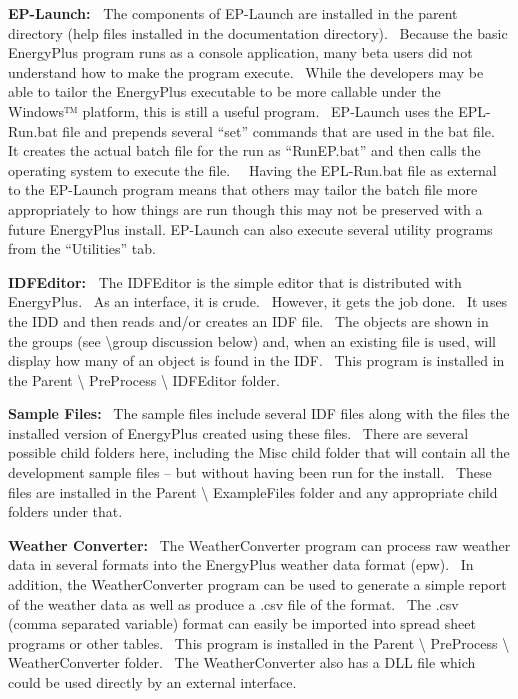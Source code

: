 \textbf{EP-Launch:~} The components of EP-Launch are installed in the parent directory (help files installed in the documentation directory).~ Because the basic EnergyPlus program runs as a console application, many beta users did not understand how to make the program execute.~ While the developers may be able to tailor the EnergyPlus executable to be more callable under the Windows™ platform, this is still a useful program.~ EP-Launch uses the EPL-Run.bat file and prepends several ``set'' commands that are used in the bat file.~ It creates the actual batch file for the run as ``RunEP.bat'' and then calls the operating system to execute the file.~~ Having the EPL-Run.bat file as external to the EP-Launch program means that others may tailor the batch file more appropriately to how things are run though this may not be preserved with a future EnergyPlus install. EP-Launch can also execute several utility programs from the ``Utilities'' tab.

\textbf{IDFEditor:~} The IDFEditor is the simple editor that is distributed with EnergyPlus.~ As an interface, it is crude.~ However, it gets the job done.~ It uses the IDD and then reads and/or creates an IDF file.~ The objects are shown in the groups (see \textbackslash{}group discussion below) and, when an existing file is used, will display how many of an object is found in the IDF.~ This program is installed in the Parent \textbackslash{} PreProcess \textbackslash{} IDFEditor folder.

\textbf{Sample Files:}~ The sample files include several IDF files along with the files the installed version of EnergyPlus created using these files.~ There are several possible child folders here, including the Misc child folder that will contain all the development sample files -- but without having been run for the install.~ These files are installed in the Parent \textbackslash{} ExampleFiles folder and any appropriate child folders under that.

\textbf{Weather Converter:}~ The WeatherConverter program can process raw weather data in several formats into the EnergyPlus weather data format (epw).~ In addition, the WeatherConverter program can be used to generate a simple report of the weather data as well as produce a .csv file of the format.~ The .csv (comma separated variable) format can easily be imported into spread sheet programs or other tables.~ This program is installed in the Parent \textbackslash{} PreProcess \textbackslash{} WeatherConverter folder.~ The WeatherConverter also has a DLL file which could be used directly by an external interface.

